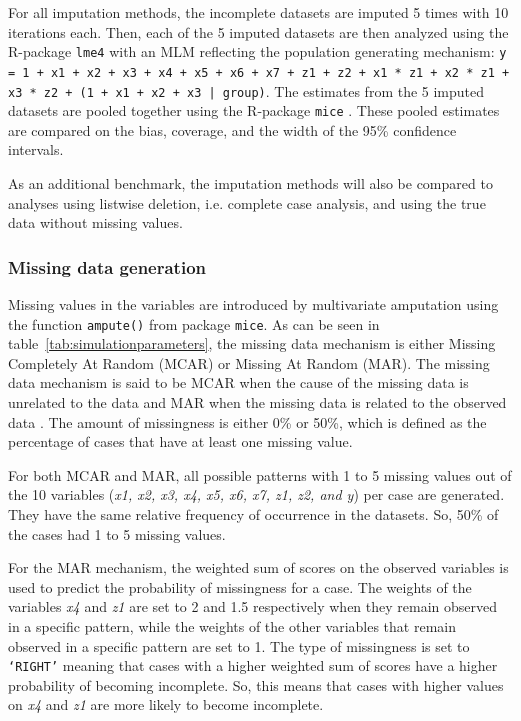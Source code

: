\documentclass[10pt, a4paper, titlepage]{article}
\begin{document}
For all imputation methods, the incomplete datasets are imputed 5 times with 10 iterations each. Then, each of the 5 imputed datasets are then analyzed using the R-package \texttt{lme4} \citep{bates2015} with an MLM reflecting the population generating mechanism: \texttt{y = 1 + x1 + x2 + x3 + x4 + x5 + x6 + x7 + z1 + z2 + x1 * z1 + x2 * z1 + x3 * z2 + (1 + x1 + x2 + x3 | group)}. The estimates from the 5 imputed datasets are pooled together using the R-package \texttt{mice} \citep{buuren2011}. These pooled estimates are compared on the bias, coverage, and the width of the 95\% confidence intervals.

As an additional benchmark, the imputation methods will also be compared to analyses using listwise deletion, i.e. complete case analysis, and using the true data without missing values.

\subsubsection{Missing data generation}
Missing values in the variables are introduced by multivariate amputation using the function \texttt{ampute()} \citep{schouten2018} from package \texttt{mice}. As can be seen in table~\ref{tab:simulationparameters}, the missing data mechanism is either Missing Completely At Random (MCAR) or Missing At Random (MAR). The missing data mechanism is said to be MCAR when the cause of the missing data is unrelated to the data and MAR when the missing data is related to the observed data \citep{rubin1976}. The amount of missingness is either 0\% or 50\%, which is defined as the percentage of cases that have at least one missing value. 

For both MCAR and MAR, all possible patterns with 1 to 5 missing values out of the 10 variables (\textit{x1, x2, x3, x4, x5, x6, x7, z1, z2, and y}) per case are generated. They have the same relative frequency of occurrence in the datasets. So, 50\% of the cases had 1 to 5 missing values. 

For the MAR mechanism, the weighted sum of scores on the observed variables is used to predict the probability of missingness for a case. The weights of the variables \textit{x4} and \textit{z1} are set to 2 and 1.5 respectively when they remain observed in a specific pattern, while the weights of the other variables that remain observed in a specific pattern are set to 1. The type of missingness is set to \texttt{`RIGHT'} meaning that cases with a higher weighted sum of scores have a higher probability of becoming incomplete. So, this means that cases with higher values on \textit{x4} and \textit{z1} are more likely to become incomplete.
\end{document}

